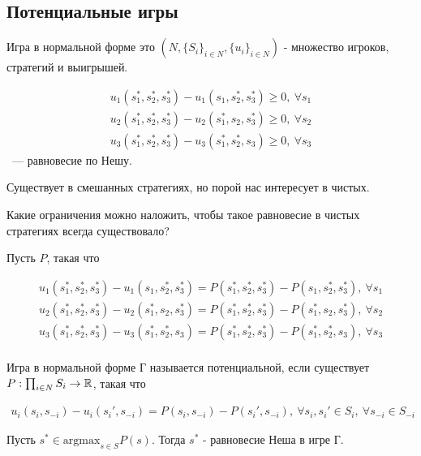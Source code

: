\documentclass[../main.tex]{subfiles}
\begin{document}
\subsection{Потенциальные игры}

\begin{remrk}
	Игра в нормальной форме это $(N, \{S_i\}_{i \in N}, \{u_i\}_{i \in N})$ - множество игроков, стратегий и выигрышей.

	\begin{align*}
		u_1(s_1^*, s_2^*, s_3^*) - u_1(s_1, s_2^*, s_3^*) \geqslant 0, \ \forall s_1 \\
		u_2(s_1^*, s_2^*, s_3^*) - u_2(s_1^*, s_2, s_3^*) \geqslant 0, \ \forall s_2 \\
		u_3(s_1^*, s_2^*, s_3^*) - u_3(s_1^*, s_2^*, s_3) \geqslant 0, \ \forall s_3
	\end{align*} ~--- равновесие по Нешу.

	Существует в смешанных стратегиях, но порой нас интересует в чистых.

	Какие ограничения можно наложить, чтобы такое равновесие в чистых стратегиях всегда существовало?


\end{remrk}


Пусть $P$, такая что 

\begin{align*}
	u_1(s_1^*, s_2^*, s_3^*) - u_1(s_1, s_2^*, s_3^*) = P(s_1^*, s_2^*, s_3^*) - P(s_1, s_2^*, s_3^*), \ \forall s_1 \\
	u_2(s_1^*, s_2^*, s_3^*) - u_2(s_1^*, s_2, s_3^*) = P(s_1^*, s_2^*, s_3^*) - P(s_1^*, s_2, s_3^*), \ \forall s_2 \\
	u_3(s_1^*, s_2^*, s_3^*) - u_3(s_1^*, s_2^*, s_3) = P(s_1^*, s_2^*, s_3^*) - P(s_1^*, s_2^*, s_3), \ \forall s_3 \\
\end{align*}

\begin{df}
	Игра в нормальной форме Г называется потенциальной, если существует $P : \prod_{i \in N} S_i \to \mathbb{R}$, такая что 

	\begin{align*}
		u_i(s_i, s_{-i}) - u_i(s_i', s_{-i}) = P(s_i, s_{-i}) - P(s_i', s_{-i}), \ \forall s_i, s_i' \in S_i, \ \forall s_{-i} \in S_{-i}
	\end{align*}

\end{df}

\begin{claim}
	Пусть $s^* \in \text{argmax}_{s \in S} P(s)$.
	Тогда  $s^*$ - равновесие Неша в игре Г. 
\end{claim}
\end{document}
